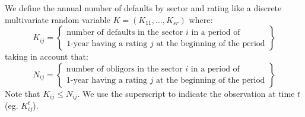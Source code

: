 \documentclass[11pt,fleqn]{book} %
\begin{document}
\begin{definition}
	We define the annual number of defaults by sector and rating like a
	discrete multivariate random variable $K=(K_{11}, \dots, K_{sr})$ where:
	\begin{displaymath}
		K_{ij} = \left\{
		\begin{array}{c}
			\text{number of defaults in the sector $i$ in a period of} \\
			\text{1-year having a rating $j$ at the beginning of the period}
		\end{array}
		\right\}
	\end{displaymath}
	taking in account that:
	\begin{displaymath}
		N_{ij} = \left\{
		\begin{array}{c}
			\text{number of obligors in the sector $i$ in a period of} \\
			\text{1-year having a rating $j$ at the beginning of the period}
		\end{array}
		\right\}
	\end{displaymath}
	Note that $K_{ij} \le N_{ij}$. We use the superscript to indicate 
	the observation at time $t$ (eg. $K_{ij}^t$). \\
	\ 
\end{definition}
\end{document}
